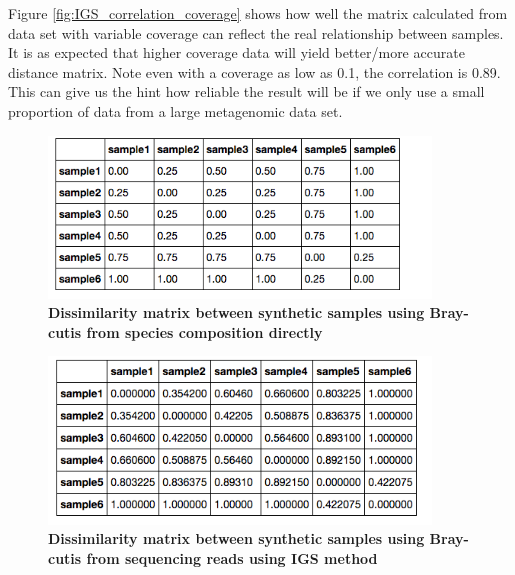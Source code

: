 Figure \ref{fig:IGS_correlation_coverage} shows how well the matrix calculated from data set with variable coverage can 
reflect the real relationship between samples. It is as expected that higher coverage data will yield better/more accurate distance matrix.
Note even with a coverage as low as 0.1, the correlation is 0.89. This can  give us the hint how reliable the result will be if 
we only use a small proportion of data from a large metagenomic data set.



\begin{figure}[!ht]
 \centerline{\includegraphics[width=4in]{./figures/simulated_real_matrix.png}}
\caption{\bf Dissimilarity matrix between synthetic samples using Bray-cutis from species composition directly }
\label{fig:simulated_real_matrix}
\end{figure}


\begin{figure}[!ht]
 \centerline{\includegraphics[width=4in]{./figures/simulated_matrix1.png}}
\caption{\bf Dissimilarity matrix between synthetic samples using Bray-cutis from sequencing reads using IGS method }
\label{fig:simulated_matrix1}
\end{figure}

